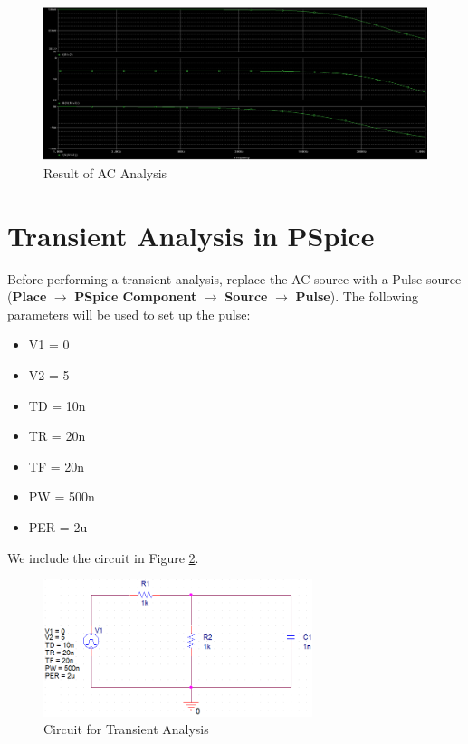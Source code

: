 \documentclass[12pt]{../manual}
\begin{document}
\begin{figure}[ht!]
\begin{center}
\includegraphics[width=\textwidth]{figures/ResultACAnalysisCrop.PNG}
\caption{Result of AC Analysis}
\label{fig:acAnalRes}
\end{center}
\end{figure}
%
\newpage
\section{Transient Analysis in PSpice}
Before performing a transient analysis, replace the AC source with a Pulse source (\textbf{Place} $\to$ \textbf{PSpice Component} $\to$ \textbf{Source} $\to$ \textbf{Pulse}). The following parameters will be used to set up the pulse: 
\begin{itemize}
\item V1 = 0
\item V2 = 5 
\item TD = 10n 
\item TR = 20n 
\item TF = 20n 
\item PW = 500n 
\item PER = 2u
\end{itemize}

We include the circuit in Figure \ref{fig:trans}.

\begin{figure}[ht!]
	\begin{center}
		\includegraphics[width=0.7\textwidth]{figures/TransientAnalysisCircuitCrop.PNG}
	\end{center}
	\caption{Circuit for Transient Analysis}
	\label{fig:trans}
\end{figure}
\end{document}
